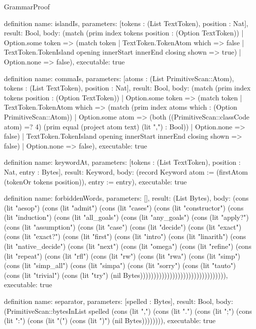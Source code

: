\begin{lexlean}{GrammarProof}
\begin{semanticmodule}
definition{
  name: islandIs,
  parameters: [tokens : (List TextToken), position : Nat],
  result: Bool,
  body: (match (prim index tokens position : (Option TextToken))
    | Option.some token => (match token
      | TextToken.TokenAtom which => false
      | TextToken.TokenIsland opening innerStart innerEnd closing shown => true)
    | Option.none => false),
  executable: true
}

definition{
  name: commaIs,
  parameters: [atoms : (List PrimitiveScan::Atom), tokens : (List TextToken), position : Nat],
  result: Bool,
  body: (match (prim index tokens position : (Option TextToken))
    | Option.some token => (match token
      | TextToken.TokenAtom which => (match (prim index atoms which : (Option PrimitiveScan::Atom))
        | Option.some atom => (both ((PrimitiveScan::classCode atom) =? 4) (prim equal (project atom text) (lit ",") : Bool))
        | Option.none => false)
      | TextToken.TokenIsland opening innerStart innerEnd closing shown => false)
    | Option.none => false),
  executable: true
}

definition{
  name: keywordAt,
  parameters: [tokens : (List TextToken), position : Nat, entry : Bytes],
  result: Keyword,
  body: (record Keyword {atom := (firstAtom (tokenOr tokens position)), entry := entry}),
  executable: true
}

definition{
  name: forbiddenWords,
  parameters: [],
  result: (List Bytes),
  body: (cons (lit "aesop") (cons (lit "admit") (cons (lit "cases") (cons (lit "constructor") (cons (lit "induction") (cons (lit "all_goals") (cons (lit "any_goals") (cons (lit "apply?") (cons (lit "assumption") (cons (lit "case") (cons (lit "decide") (cons (lit "exact") (cons (lit "exact?") (cons (lit "first") (cons (lit "intro") (cons (lit "linarith") (cons (lit "native_decide") (cons (lit "next") (cons (lit "omega") (cons (lit "refine") (cons (lit "repeat") (cons (lit "rfl") (cons (lit "rw") (cons (lit "rwa") (cons (lit "simp") (cons (lit "simp_all") (cons (lit "simpa") (cons (lit "sorry") (cons (lit "tauto") (cons (lit "trivial") (cons (lit "try") (nil Bytes)))))))))))))))))))))))))))))))),
  executable: true
}

definition{
  name: separator,
  parameters: [spelled : Bytes],
  result: Bool,
  body: (PrimitiveScan::bytesInList spelled (cons (lit ",") (cons (lit ".") (cons (lit ";") (cons (lit ":") (cons (lit "(") (cons (lit ")") (nil Bytes)))))))),
  executable: true
}


\end{semanticmodule}
\end{lexlean}
